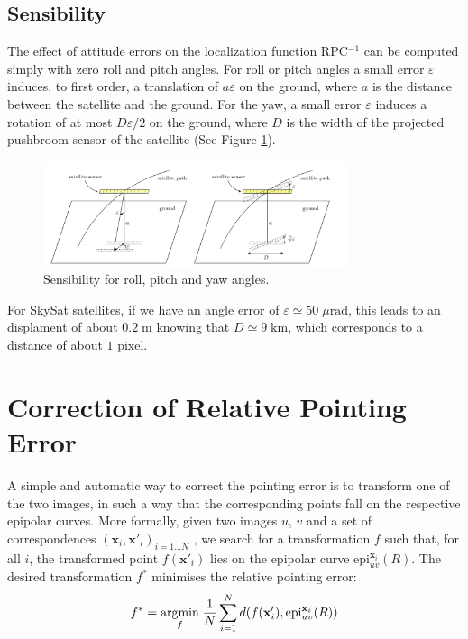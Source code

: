\documentclass[paper=a4, fontsize=11pt, onecolumn, tikz, dvipsnames, svgnames, x11names]{article}
\begin{document}
\subsection{Sensibility}
\label{subsec:sensibility}
The effect of attitude errors on the localization function RPC$^{-1}$ can be computed simply with zero roll and pitch angles. For roll or pitch angles
a small error $\varepsilon$ induces, to first order, a translation of $a\varepsilon$ on the ground, where $a$ is
the distance between the satellite and the ground. For the yaw, a small error $\varepsilon$  induces
a rotation of at most $D\varepsilon/2$ on the ground, where $D$ is the width of the projected pushbroom sensor of the satellite (See Figure \ref{sensiblity}).

\begin{figure}[h]
    \centering
    \includegraphics[width=0.8\textwidth]{figures/sensibility.png}
   \caption{Sensibility for roll, pitch and yaw angles.}
   \label{sensiblity}
\end{figure}

For SkySat satellites, if we have an angle error of $\varepsilon \simeq 50 \; \mu \text{rad}$, this leads to an displament of about $0.2 \;\text{m}$  knowing that $D \simeq 9 \;\text{km}$, which corresponds to a distance of about $1$ pixel.

\section{Correction of Relative Pointing Error}

A simple and automatic way to correct the pointing error is to transform one of the two images, in such a way that the corresponding points fall on the respective epipolar curves. More formally, given two images $u$, $v$ and a set of correspondences $(\textbf{x}_i , \textbf{x}'_i)_{i=1...N}$ , we search for a transformation $f$ such that, for all $i$, the transformed point $f(\textbf{x}'_i)$ lies on the epipolar curve $\text{epi}^{\textbf{x}_i}_{u v}(R)$.
The desired transformation $f^{*}$ minimises the relative pointing error:
\begin{align}
\label{minif}
f^* = \underset{f}{\operatorname{argmin}}\; \dfrac{1}{N} \sum\limits_{i=1}^{N} d(f(\textbf{x}'_i), \text{epi}^{\textbf{x}_i}_{u v}(R))
\end{align}
\end{document}
